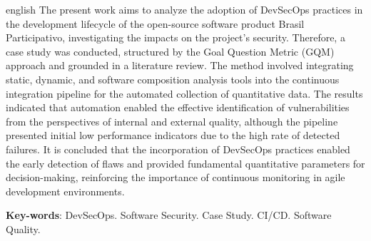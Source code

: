 \begin{resumo}[Abstract]
 \begin{otherlanguage*}{english}
    The present work aims to analyze the adoption of DevSecOps practices in the development lifecycle of the open-source software product Brasil Participativo, investigating the impacts on the project's security. 
    Therefore, a case study was conducted, structured by the Goal Question Metric (GQM) approach and grounded in a literature review. The method involved integrating static, dynamic, and software composition analysis tools into the continuous integration pipeline
    for the automated collection of quantitative data. The results indicated that automation enabled the effective identification of vulnerabilities from the perspectives of internal and external quality, although the pipeline presented 
    initial low performance indicators due to the high rate of detected failures. It is concluded that the incorporation of DevSecOps practices enabled the early detection of flaws and provided fundamental quantitative parameters for 
    decision-making, reinforcing the importance of continuous monitoring in agile development environments.

    \vspace{\onelineskip}
  
    \noindent 
    \textbf{Key-words}: DevSecOps. Software Security. Case Study. CI/CD. Software Quality.
 \end{otherlanguage*}
\end{resumo}
